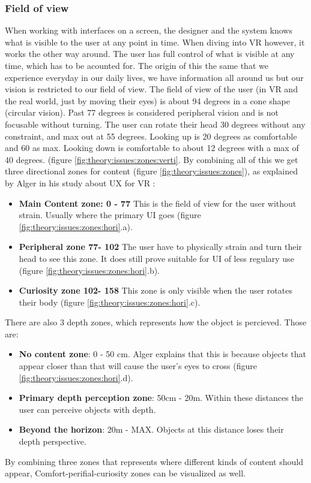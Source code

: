 \subsubsection{Field of view}
When working with interfaces on a screen, the designer and the system knows what is visible to the user at any point in time. When diving into VR however, it works the other way around. The user has full control of what is visible at any time, which has to be acounted for. The origin of this the same that we experience everyday in our daily lives, we have information all around us but our vision is restricted to our field of view. The field of view of the user (in VR and the real world, just by moving their eyes) is about 94 degrees in a cone shape (circular vision). Past 77 degrees is considered peripheral vision and is not focusable without turning. The user can rotate their head 30 degrees without any constraint, and max out at 55 degrees. Looking up is 20 degrees as comfortable and 60 as max. Looking down is comfortable to about 12 degrees with a max of 40 degrees. (figure \ref{fig:theory:issues:zones:verti}. By combining all of this we get three directional zones for content (figure \ref{fig:theory:issues:zones}), as explained by Alger in his study about UX for VR \cite{UX:Alger2015}:
\begin{itemize}
  \item \textbf{Main Content zone: 0 - 77\degree} This is the field of view for the user without strain. Usually where the primary UI goes (figure \ref{fig:theory:issues:zones:hori}.a).
  \item \textbf{Peripheral zone 77\degree - 102\degree} The user have to physically strain and turn their head to see this zone. It does still prove suitable for UI of less regulary use (figure \ref{fig:theory:issues:zones:hori}.b).
  \item \textbf{Curiosity zone 102\degree - 158\degree} This zone is only visible when the user rotates their body (figure \ref{fig:theory:issues:zones:hori}.c).
\end{itemize}
There are also 3 depth zones, which represents how the object is percieved. Those are:
\begin{itemize}
\item \textbf{No content zone}: 0 - 50 cm. Alger explains that this is because objects that appear closer than that will cause the user's eyes to cross (figure \ref{fig:theory:issues:zones:hori}.d).
\item \textbf{Primary depth perception zone}: 50cm - 20m. Within these distances the user can perceive objects with depth.
\item \textbf{Beyond the horizon}: 20m - MAX. Objects at this distance loses their depth perspective.
\end{itemize}
By combining three zones that represents where different kinds of content should appear,  Comfort-perifial-curiosity zones can be visualized as well. \cite{UX:Alger2015}

